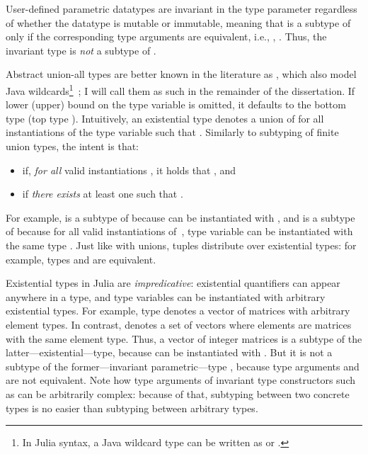 User-defined parametric datatypes are invariant in the type parameter
regardless of whether the datatype is
mutable or immutable, meaning that  is a subtype of 
 only if the corresponding type arguments are equivalent,
i.e., , .
Thus, the invariant %
type  is \emph{not}
a subtype of .

Abstract union-all types  are better known
in the literature as , which also model
Java wildcards\footnote{In Julia syntax, a Java wildcard type
 can be written as 
or .}~\cite{bib:torgersen:wildcards:2004};
I will call them as such in the remainder of the dissertation.
If lower (upper) bound on the type variable is omitted, it defaults to the
bottom type  (top type ).
Intuitively, an existential type denotes a union of  for all
instantiations of the type variable  such that .
Similarly to subtyping of finite union types, the intent is that:
\begin{itemize}
  \item {} if, \emph{for all} valid instantiations
    , it holds that , and
  \item {} if \emph{there exists} at least one 
     such that .
\end{itemize}
For example,  is a subtype of  because  can be instantiated with ,
and  is a subtype of
 because for all valid instantiations  of~,
type variable  can be instantiated with the same type .
Just like with unions, tuples distribute over existential types:
for example, types 
and  are equivalent.

Existential types in Julia are \emph{impredicative}:
existential quantifiers can appear anywhere in a type,
and type variables can be instantiated with arbitrary existential types.
For example, type  denotes a vector
of matrices with arbitrary element types.
In contrast,  denotes a set of vectors where
elements are matrices with the same element type.
Thus, a vector of integer matrices  is a subtype
of the latter---existential---type, because  can be instantiated with
. But it is not a subtype of the former---invariant parametric---type
, because type arguments 
and  are not equivalent.
Note how type arguments of invariant type constructors such as 
can be arbitrarily complex: because of that, subtyping between two
concrete types is no easier than subtyping between arbitrary types.

